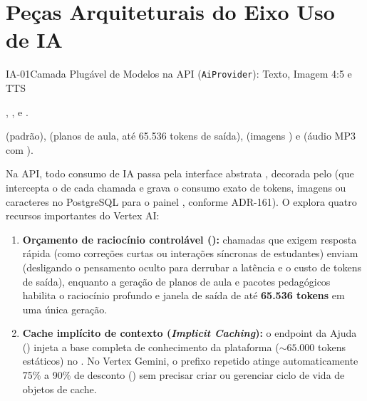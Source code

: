 \section{Peças Arquiteturais do Eixo Uso de IA}
\label{sec:pecas-ia}

\begin{pecaarq}{IA-01}{Camada Plugável de Modelos na API (\texttt{AiProvider}): Texto, Imagem 4:5 e TTS}{\sgcp~\nativo\enspace\saws~\adaptacao\enspace\sazure~\equivalente}
\begin{campos}
  \item[Código na API] , ,  e .
  \item[Modelos atuais (GCP)]  (padrão),  (planos de aula, até 65.536 tokens de saída),  (imagens ) e  (áudio MP3 com ).
  \item[Como é hoje (GCP)] Na API, todo consumo de IA passa pela interface abstrata , decorada pelo  (que intercepta o  de cada chamada e grava o consumo exato de tokens, imagens ou caracteres no PostgreSQL para o painel , conforme ADR-161). O  explora quatro recursos importantes do Vertex AI:
  \begin{enumerate}
    \item \textbf{Orçamento de raciocínio controlável ():} chamadas que exigem resposta rápida (como correções curtas ou interações síncronas de estudantes) enviam  (desligando o pensamento oculto para derrubar a latência e o custo de tokens de saída), enquanto a geração de planos de aula e pacotes pedagógicos habilita o raciocínio profundo e janela de saída de até \textbf{65.536 tokens} em uma única geração.
    \item \textbf{Cache implícito de contexto (\emph{Implicit Caching}):} o endpoint da Ajuda () injeta a base completa de conhecimento da plataforma ($\sim 65.000$ tokens estáticos) no . No Vertex Gemini, o prefixo repetido atinge automaticamente 75\% a 90\% de desconto () sem precisar criar ou gerenciar ciclo de vida de objetos de cache.

\end{enumerate}
\end{campos}
\end{pecaarq}
